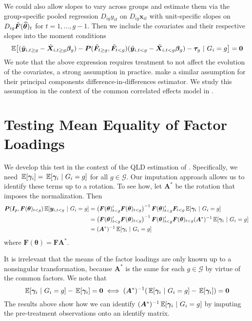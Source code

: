 We could also allow slopes to vary across groups and estimate them via the group-specific pooled regression $D_{ig} y_{it}$ on $D_{ig} \bm x_{it}$ with unit-specific slopes on $D_{ig} \Tilde{\bm{F}}(\widehat{\bm{\theta}})_t$ for $t = 1,..., g-1$. Then we include the covariates and their respective slopes into the moment conditions
\begin{equation}
    \expec{(\tilde{\bm y}_{i,t\geq g} - \tilde{\bm X}_{i, t \geq g} \bm \beta_g) - \bm P(\tilde{\bm{F}}_{t \geq g}, \tilde{\bm{F}}_{t < g}) (\tilde{\bm y}_{i,t< g} - \tilde{\bm X}_{i, t < g} \bm \beta_g) - \bm \tau_g  }{G_i = g} = \bm 0
\end{equation}
We note that the above expression requires treatment to not affect the evolution of the covariates, a strong assumption in practice. \citet{Chan_and_Kwok_2022} make a similar assumption for their principal components difference-in-differences estimator. We study this assumption in the context of the common correlated effects model in \citet{Brown_Butts_Westerlund_2023}.


\section{Testing Mean Equality of Factor Loadings}

We develop this test in the context of the QLD estimation of \citet{Ahn_Lee_Schmidt_2013}. Specifically, we need $\expec{\bm \gamma_i} = \expec{\bm \gamma_i}{G_i = g}$ for all $g \in \mathcal{G}$. Our imputation approach allows us to identify these terms up to a rotation. To see how, let $\bm A^*$ be the rotation that imposes the \citet{Ahn_Lee_Schmidt_2013} normalization. Then
\begin{align*}
    \bm P(\bm I_{p}, \bm{F}(\bm{\theta})_{t < g}) \expec{\bm y_{i, t < g}}{G_i = g} 
    &= \left( \bm{F}(\bm{\theta})_{t < g}' \bm{F}(\bm{\theta})_{t < g} \right)^{-1} \bm{F}(\bm{\theta})_{t < g}' \bm{F}_{t < g} \expec{\bm \gamma_i}{G_i = g}\\
    &= \left( \bm{F}(\bm{\theta})_{t < g}' \bm{F}(\bm{\theta})_{t < g} \right)^{-1} \bm{F}(\bm{\theta})_{t < g}' \bm{F}(\bm{\theta})_{t < g} (\bm A^*)^{-1} \expec{\bm \gamma_i}{G_i = g}\\
    &= (\bm A^*)^{-1} \expec{\bm \gamma_i}{G_i = g}
\end{align*}
where $\bm{F}(\bm{\theta}) = \bm{F} \bm A^*$.

It is irrelevant that the means of the factor loadings are only known up to a nonsingular transformation, because $\bm A^*$ is the same for each $g \in \mathcal{G}$ by virtue of the common factors. We note that
\begin{equation}
    \expec{\bm \gamma_i}{G_i = g} - \expec{\bm \gamma_i} = \bm 0 \iff (\bm A^*)^{-1}(\expec{\bm \gamma_i}{G_i = g} - \expec{\bm \gamma_i}) = \bm 0
\end{equation}
The results above show how we can identify $(\bm A^*)^{-1} \expec{\bm \gamma_i}{G_i = g}$ by imputing the pre-treatment observations onto an identify matrix. 

